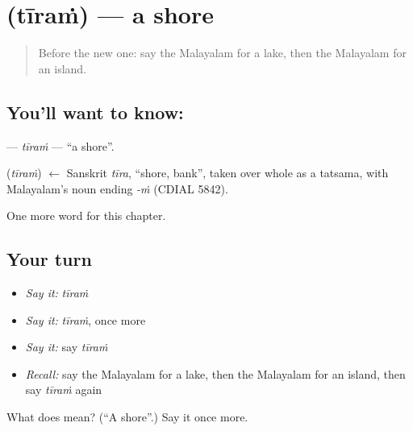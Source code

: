 \section[\texorpdfstring{\ml{തീരം} (tīraṁ)}{തീരം (tīraṁ)}]{ (tīraṁ) — a shore}

\label{lesson:ML-C148-tiram}



\begin{quote}
Before the new one: say the Malayalam for a lake, then the Malayalam for an island.
\end{quote}

\subsection*{You'll want to know: }
\textbf{} — \emph{tīraṁ} — \textquotedblleft{}a shore\textquotedblright{}.

\begin{cousinweb}
\textbf{} (\emph{tīraṁ}) $\leftarrow$ Sanskrit \emph{tīra}, \textquotedblleft{}shore, bank\textquotedblright{}, taken over whole as a tatsama, with Malayalam's noun ending \emph{-ṁ} (CDIAL 5842).
\end{cousinweb}

\begin{grammarlens}[title={What you've built}]
One more word for this chapter.
\end{grammarlens}

\subsection*{Your turn}
\begin{itemize}
\raggedright
  \item \emph{Say it:} \emph{tīraṁ}
  \item \emph{Say it:} \emph{tīraṁ}, once more
  \item \emph{Say it:} say \emph{tīraṁ}
  \item \emph{Recall:} say the Malayalam for a lake, then the Malayalam for an island, then say \emph{tīraṁ} again
\end{itemize}

\begin{tcolorbox}[breakable,colback=teal!4,colframe=teal!35!black,title={Before you move on}]
What does  mean? (\textquotedblleft{}A shore\textquotedblright{}.) Say it once more.
\end{tcolorbox}
